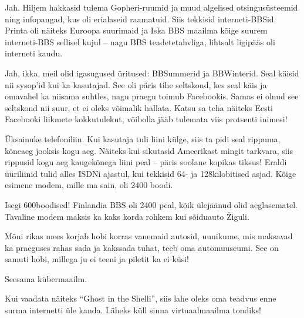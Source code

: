 Jah. Hiljem hakkasid tulema Gopheri-ruumid ja muud algelised 
otsingusüsteemid ning infopangad, kus oli erialaseid raamatuid. Siis tekkisid 
interneti-BBSid. Printa oli näiteks Euroopa suurimaid ja 
Iska BBS 
maailma kõige suurem interneti-BBS sellisel kujul -- nagu BBS 
teadetetahvliga, lihtsalt ligipääs oli interneti kaudu.


Jah, ikka, meil olid igasugused üritused: BBSummerid ja 
BBWinterid. Seal käisid nii sysop'id kui ka kasutajad. See oli 
päris tihe seltskond, kes seal käis ja omavahel ka niisama suhtles, 
nagu praegu toimub Facebookis. Samas ei olnud see seltskond nii suur, et 
ei oleks võimalik hallata. Katsu sa teha näiteks Eesti Facebooki liikmete 
kokkutulekut, võibolla jääb tulemata viis protsenti inimesi!


Üksainuke telefoniliin. Kui kasutaja tuli liini külge, 
siis ta pidi seal rippuma, kõneaeg jooksis kogu aeg. Näiteks kui 
sikutasid Ameerikast mingit tarkvara, siis rippusid kogu aeg 
kaugekõnega liini peal -- päris soolane kopikas tiksus! Eraldi üüriliinid tulid 
alles ISDNi ajastul, kui tekkisid 64- ja 128kilobitised asjad. Kõige 
esimene modem, mille ma sain, oli 2400 boodi.


Isegi 600boodised! Finlandia BBS oli 2400 peal, kõik ülejäänud 
olid aeglasematel. Tavaline modem maksis ka kaks korda rohkem kui sõiduauto 
Žiguli.


Mõni rikas mees korjab hobi korras vanemaid autosid, 
uunikume, mis maksavad ka praeguses rahas sada ja kakssada tuhat, 
teeb oma automuuseumi. See on samuti hobi, millega ju ei 
teeni ja piletit ka ei küsi!


Seesama kübermaailm. 

Kui vaadata näiteks \enquote{Ghost in the Shelli}, siis lahe oleks 
oma teadvus enne surma internetti üle kanda. Läheks küll sinna 
virtuaalmaailma tondiks!

